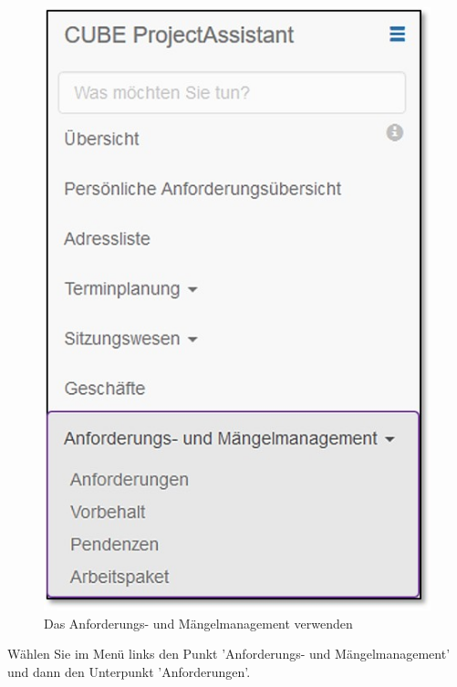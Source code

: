 \begin{figure}   %
  \vspace{-30pt}      %
  \begin{center}
    \includegraphics[width=1\linewidth]{../chapters/06_Anf-Maengelmanagement/pictures/amm_Menue.jpg}
  \end{center}
  \vspace{-20pt}
  \caption{Das Anforderungs- und Mängelmanagement verwenden}
  \vspace{-10pt}
\end{figure}

Wählen Sie im Menü links den Punkt 'Anforderungs- und Mängelmanagement' und dann den Unterpunkt 'Anforderungen'.

